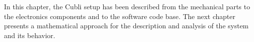 In this chapter, the Cubli setup has been described from the mechanical parts to the electronics components and to the software code base.
The next chapter presents a mathematical approach for the description and analysis of the system and its behavior.